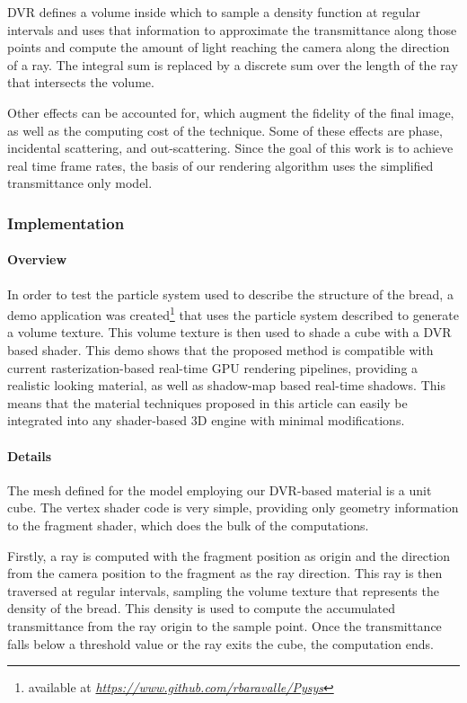 \documentclass[oneside,a4paper,english,links]{amca}
\begin{document}
DVR defines a volume inside which to sample a density function at
regular intervals and uses that information to approximate the
transmittance along those points and compute the amount of light
reaching the camera along the direction of a ray. The integral sum is
replaced by a discrete sum over the length of the ray that intersects
the volume.

Other effects can be accounted for, which augment the fidelity of the
final image, as well as the computing cost of the technique. Some of
these effects are phase, incidental scattering, and
out-scattering. Since the goal of this work is to achieve real time
frame rates, the basis of our rendering algorithm uses the simplified
transmittance only model.

\subsubsection{Implementation}

\paragraph{Overview}

In order to test the particle system used to describe the structure of
the bread, a demo application was created\footnote{available at
  \emph{\url{https://www.github.com/rbaravalle/Pysys}}} that uses the particle
system described to generate a volume texture. This volume texture is
then used to shade a cube with a DVR based shader. This demo shows
that the proposed method is compatible with current
rasterization-based real-time GPU rendering pipelines, providing a
realistic looking material, as well as shadow-map based real-time
shadows. This means that the material techniques proposed in this
article  can easily be integrated into any shader-based 3D engine with
minimal modifications.

\paragraph{Details}

The mesh defined for the model employing our DVR-based material is a unit
cube. The vertex shader code is very simple, providing only geometry
information to the fragment shader, which does the bulk of the
computations. 

Firstly, a ray is computed with the fragment position as origin and
the direction from the camera position to the fragment as the ray
direction. This ray is then traversed at regular intervals, sampling
the volume texture that represents the density of the bread. This
density is used to compute the accumulated transmittance from the ray
origin to the sample point. Once the transmittance falls below a
threshold value or the ray exits the cube, the computation ends.
\end{document}
